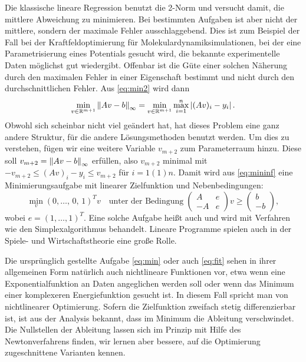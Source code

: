 Die klassische lineare Regression benutzt die 2-Norm und versucht
damit, die mittlere Abweichung zu minimieren. Bei bestimmten Aufgaben
ist aber nicht der mittlere, sondern der maximale Fehler
ausschlaggebend. Dies ist zum Beispiel der Fall bei der
Kraftfeldoptimierung für Molekulardynamiksimulationen, bei der eine
Parametrisierung eines Potentials gesucht wird, die bekannte
experimentelle Daten möglichst gut wiedergibt. Offenbar ist die Güte
einer solchen Näherung durch den maximalen Fehler in einer Eigenschaft
bestimmt und nicht durch den durchschnittlichen Fehler.  Aus
\eqref{eq:min2} wird dann
\begin{equation}
  \label{eq:mininf}
  \min_{v\in\mathbb{R}^{m+1}} \left\lVert{A v -
    b}\right\rVert_\infty = \min_{v\in\mathbb{R}^{m+1}} \max_{i=1}^n \left\lvert{(A v)_i - y_i}\right\rvert.
\end{equation}
Obwohl sich scheinbar nicht viel geändert hat, hat dieses Problem eine
ganz andere Struktur, für die andere Lösungsmethoden benutzt
werden. Um dies zu verstehen, fügen wir eine weitere Variable
$v_{m+2}$ zum Parameterraum hinzu. Diese soll $v_{m+2} = \left\lVert{A v -
  b}\right\rVert_\infty$ erfüllen, also $v_{m+2}$ minimal mit $-v_{m+2}\le (A v)_i
- y_i \le v_{m+2}$ für $i=1(1)n$. Damit wird aus \eqref{eq:mininf}
eine Minimierungsaufgabe mit linearer Zielfunktion und
Nebenbedingungen:
\begin{equation}
  \label{eq:chebyshevappr}
  \min_v (0,\ldots,\,0,\,1)^T v\quad\text{unter der Bedingung}\;
  \begin{pmatrix}
    A  & e\\
    -A & e
  \end{pmatrix} v \ge
  \begin{pmatrix}
    b\\
    -b
  \end{pmatrix},
\end{equation}
wobei $e=(1,\ldots,1)^T$. Eine solche Aufgabe heißt auch
\emph{} und wird mit Verfahren wie den
Simplexalgorithmus behandelt. Lineare Programme spielen auch in der
Spiele- und Wirtschaftstheorie eine große Rolle.

Die ursprünglich gestellte Aufgabe \eqref{eq:min} oder auch
\eqref{eq:fit} sehen in ihrer allgemeinen Form natürlich auch
nichtlineare Funktionen vor, etwa wenn eine Exponentialfunktion an
Daten angeglichen werden soll oder wenn das Minimum einer komplexeren
Energiefunktion gesucht ist.  In diesem Fall spricht man von
nichtlinearer Optimierung.  Sofern die Zielfunktion zweifach stetig
differenzierbar ist, ist aus der Analysis bekannt, dass im Minimum die
Ableitung verschwindet. Die Nullstellen der Ableitung lassen sich im
Prinzip mit Hilfe des Newtonverfahrens finden, wir lernen aber
bessere, auf die Optimierung zugeschnittene Varianten kennen.

